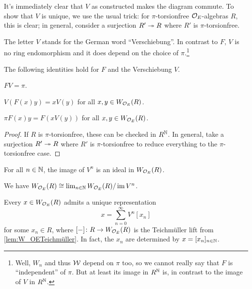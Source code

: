 \documentclass[a4paper, 10pt, oneside, DIV=9, chapterprefix=true, numbers=enddot,bibliography=totoc]{scrbook}
\begin{document}
\begin{proof*}
	It's immediately clear that $V$ as constructed makes the diagram commute. To show that $V$ is unique, we use the usual trick: for $\pi$-torsionfree $\mathcal{O}_E$-algebras $R$, this is clear; in general, consider a surjection $R'\epimorphism R$ where $R'$ is $\pi$-torsionfree.
\end{proof*}
The letter $V$ stands for the German word \enquote{Verschiebung}. In contrast to $F$, $V$ is no ring endomorphism and it does depend on the choice of $\pi$.\footnote{Well, $W_n$ and thus $\mathcal{W}$ depend on $\pi$ too, so we cannot really say that $F$ is \enquote{independent} of $\pi$. But at least its image in $R^{\mathbb{N}}$ is, in contrast to the image of $V$ in $R^{\mathbb{N}}$.}
\begin{lem}\label{lem:FVidentities}
	The following identities hold for $F$ and the Verschiebung $V$.
	\begin{numerate}
		\item $FV=\pi$.
		\item $V(F(x)y)=xV(y)$ for all $x,y\in W_{\mathcal{O}_E}(R)$.
		\item $\pi F(x)y=F(xV(y))$ for all $x,y\in W_{\mathcal{O}_E}(R)$. 
	\end{numerate}
\end{lem}
\begin{proof}
	If $R$ is $\pi$-torsionfree, these can be checked in $R^{\mathbb{N}}$. In general, take a surjection $R'\epimorphism R$ where $R'$ is $\pi$-torsionfree to reduce everything to the $\pi$-torsionfree case.
\end{proof}
\begin{lem}\label{lem:imVn}
	\begin{numerate}
		\item For all $n\in\mathbb{N}$, the image of $V^n$ is an ideal in $W_{\mathcal{O}_E}(R)$.
		\item We have $W_{\mathcal{O}_E}(R)\cong \lim_{n\in\mathbb{N}}W_{\mathcal{O}_E}(R)/\operatorname{im} V^n$.
		\item Every $x\in W_{\mathcal{O}_E}(R)$ admits a unique representation
		\begin{equation*}
			x=\sum_{n=0}^\infty V^n[x_n]
		\end{equation*}
		for some $x_n\in R$, where $[-]\colon R\morphism W_{\Oo_E}(R)$ is the Teichmüller lift from \cref{lem:W_OETeichmüller}. In fact, the $x_n$ are determined by $x=[x_n]_{n\in\mathbb{N}}$.
	\end{numerate}
\end{lem}
\end{document}
